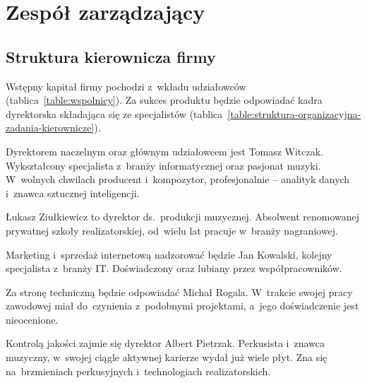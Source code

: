 \documentclass[12pt]{article}
\begin{document}
\section{Zespół zarządzający}


\subsection{Struktura kierownicza firmy}

Wstępny kapitał firmy pochodzi z~wkładu udziałowców (tablica~\ref{table:wspolnicy}).
Za sukces produktu będzie odpowiadać kadra dyrektorska składająca się ze specjalistów (tablica~\ref{table:struktura-organizacyjna-zadania-kierownicze}).

Dyrektorem naczelnym oraz głównym udziałowcem jest Tomasz Witczak.
Wykształcony specjalista z~branży informatycznej oraz pasjonat muzyki.
W~wolnych chwilach producent i~kompozytor, profesjonalnie -- analityk danych i~znawca sztucznej inteligencji.

Łukasz Ziułkiewicz to dyrektor ds.~produkcji muzycznej.
Absolwent renomowanej prywatnej szkoły realizatorskiej, od~wielu lat pracuje w~branży nagraniowej.

Marketing i~sprzedaż internetową nadzorować będzie Jan Kowalski, kolejny specjalista z~branży IT.
Doświadczony oraz lubiany przez współpracowników.

Za stronę techniczną będzie odpowiadać Michał Rogala.
W~trakcie swojej pracy zawodowej miał do~czynienia z~podobnymi projektami, a~jego doświadczenie jest nieocenione.

Kontrolą jakości zajmie się dyrektor Albert Pietrzak.
Perkusista i~znawca muzyczny, w~swojej ciągle aktywnej karierze wydał już wiele płyt.
Zna się na~brzmieniach perkusyjnych i~technologiach realizatorskich.

\begin{table}[h!]
    \begin{center}
            \caption{Wspólnicy i~wnoszone wkłady}
            \label{table:wspolnicy}
    \end{center}
\end{table}
\end{document}

